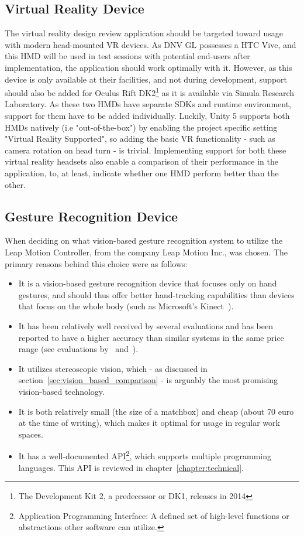 \subsection{Virtual Reality Device}
The virtual reality design review application should be targeted toward usage with modern head-mounted VR devices.
As DNV GL possesses a HTC Vive, and this HMD will be used in test sessions with potential end-users after implementation, 
the application should work optimally with it. However, as this device is only available at their facilities, and not during development, support 
should also be added for Oculus Rift DK2\footnote{The Development Kit 2, a predecessor or DK1, releases in 2014} as it is available via Simula Research Laboratory.
As these two HMDs have separate SDKs and runtime environment, support for them have to be added individually. 
Luckily, Unity 5 supports both HMDs natively (i.e "out-of-the-box") by enabling the project specific setting "Virtual Reality Supported", 
so adding the basic VR functionality - such as camera rotation on head turn - is trivial. 
Implementing support for both these virtual reality headsets also enable a comparison of their performance in the application, to, at least, indicate whether 
one HMD perform better than the other. 

\subsection{Gesture Recognition Device}
\label{sec:design_leapmotion}
When deciding on what vision-based gesture recognition system to utilize the Leap Motion Controller, from the company Leap Motion Inc., was chosen.
The primary reasons behind this choice were as follows: 
\begin{itemize}
    \item It is a vision-based gesture recognition device that focuses only on hand gestures, and should thus offer better hand-tracking capabilities than devices that focus 
          on the whole body (such as Microsoft's Kinect~\citep{Zhang2012}).
    \item It has been relatively well received by several evaluations and has been reported to have a higher accuracy than similar systems in the same price range
            (see evaluations by~\citet{Weichert2013} and~\citet{Guna2014}).
    \item It utilizes stereoscopic vision, which - as discussed in section~\vref{sec:vision_based_comparison} - is arguably the most promising vision-based technology.
    \item It is both relatively small (the size of a matchbox) and cheap (about 70 euro at the time of writing), which makes it optimal for usage in regular work spaces. 
    \item It has a well-documented API\footnote{Application Programming Interface: A defined set of high-level functions or abstractions other software can utilize.}, which 
          supports multiple programming languages. This API is reviewed in chapter~\ref{chapter:technical}.
\end{itemize}

